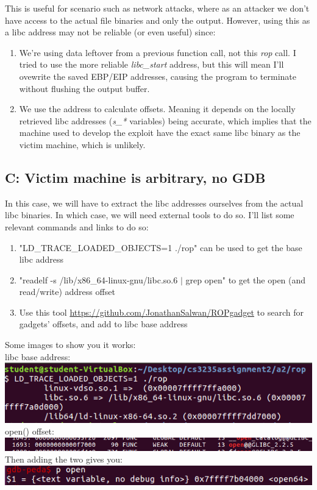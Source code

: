\documentclass[12pt]{article}
\begin{document}
This is useful for scenario such as network attacks, where as an attacker we don't have access to the actual file binaries and only the output.
However, using this as a libc address may not be reliable (or even useful) since:
\begin{enumerate}
    \item We're using data leftover from a previous function call, not this \emph{rop} call. I tried to use the more reliable \emph{libc\_start} address, but this will mean I'll ovewrite the saved EBP/EIP addresses, causing the program to terminate without flushing the output buffer.
    \item We use the address to calculate offsets. Meaning it depends on the locally retrieved libc addresses (\emph{s\_*} variables) being accurate, which implies that the machine used to develop the exploit have the exact same libc binary as the victim machine, which is unlikely.
\end{enumerate}

\newpage
\subsection*{C: Victim machine is arbitrary, no GDB}
In this case, we will have to extract the libc addresses ourselves from the actual libc binaries.
In which case, we will need external tools to do so.
I'll list some relevant commands and links to do so:
\begin{enumerate}
    \item "LD\_TRACE\_LOADED\_OBJECTS=1 ./rop" can be used to get the base libc address
    \item "readelf -s /lib/x86\_64-linux-gnu/libc.so.6 $|$ grep open" to get the open (and read/write) address offset
    \item Use this tool \url{https://github.com/JonathanSalwan/ROPgadget} to search for gadgets' offsets, and add to libc base address
\end{enumerate}
Some images to show you it works:\\
libc base address:\\
\includegraphics[scale=1]{./a2/rop/libcaddr.PNG}\\
open() offset:\\
\includegraphics[scale=1]{./a2/rop/openoffset.PNG}\\
Then adding the two gives you:\\
\includegraphics[scale=1]{./a2/rop/openaddr.PNG}
\end{document}
